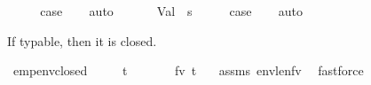 \begin{isabellebody}
\ \ \isamarkupfalse%
\ \isamarkupfalse%
\ {\isacharquery}{\kern0pt}case\isanewline
\ \ \isamarkupfalse%
\ auto\isanewline
\ \ \isamarkupfalse%
\isanewline
{}\isamarkupfalse%
\isanewline
\ \ \isamarkupfalse%
\ {\isacharparenleft}{\kern0pt}Val\ {\isasymGamma}\ s{\isacharparenright}{\kern0pt}\isanewline
\ \ \isamarkupfalse%
\ \isamarkupfalse%
\ {\isacharquery}{\kern0pt}case\isanewline
\ \ \isamarkupfalse%
\ auto\isanewline
\ \ \isamarkupfalse%
\isanewline
{}\isamarkupfalse%
%
\endisatagproof
{\isafoldproof}%
%
\isadelimproof
%
\endisadelimproof
%
\begin{isamarkuptext}%
If typable, then it is closed.%
\end{isamarkuptext}\isamarkuptrue%
\isamarkupfalse%
\ emp{\isacharunderscore}{\kern0pt}env{\isacharunderscore}{\kern0pt}closed{\isacharcolon}{\kern0pt}\isanewline
\ \ \ {\isachardoublequoteopen}{\isacharbrackleft}{\kern0pt}{\isacharbrackright}{\kern0pt}\ {\isasymturnstile}\ t\ {\isacharcolon}{\kern0pt}\ {\isasymtau}{\isachardoublequoteclose}\isanewline
\ \ \ \ \ {\isachardoublequoteopen}fv\ t\ {\isacharequal}{\kern0pt}\ {\isacharbraceleft}{\kern0pt}{\isacharbraceright}{\kern0pt}{\isachardoublequoteclose}\isanewline
%
\isadelimproof
%
\endisadelimproof
%
\isatagproof
{}\isamarkupfalse%
\ assms\ envlen{\isacharunderscore}{\kern0pt}fv\ \isamarkupfalse%
\ fastforce%
\endisatagproof
{\isafoldproof}%
%
\isadelimproof
\isanewline
%
\endisadelimproof
\isanewline
%
\isadelimtheory
\isanewline
%
\endisadelimtheory
%
\isatagtheory
{}\isamarkupfalse%
%
\endisatagtheory
{\isafoldtheory}%
%
\isadelimtheory
%
\endisadelimtheory
%
\end{isabellebody}%
\endinput
